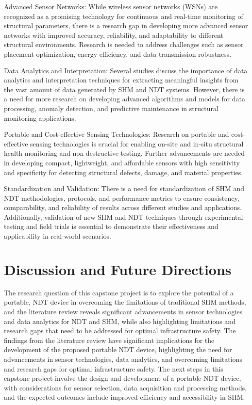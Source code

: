 \documentclass[journal, a4paper]{IEEEtran}
\begin{document}
Advanced Sensor Networks: While wireless sensor networks (WSNs) are recognized as a promising technology for continuous and real-time monitoring of structural parameters, there is a research gap in developing more advanced sensor networks with improved accuracy, reliability, and adaptability to different structural environments. Research is needed to address challenges such as sensor placement optimization, energy efficiency, and data transmission robustness. 

Data Analytics and Interpretation: Several studies discuss the importance of data analytics and interpretation techniques for extracting meaningful insights from the vast amount of data generated by SHM and NDT systems. However, there is a need for more research on developing advanced algorithms and models for data processing, anomaly detection, and predictive maintenance in structural monitoring applications. 

Portable and Cost-effective Sensing Technologies: Research on portable and cost-effective sensing technologies is crucial for enabling on-site and in-situ structural health monitoring and non-destructive testing. Further advancements are needed in developing compact, lightweight, and affordable sensors with high sensitivity and specificity for detecting structural defects, damage, and material properties. 

Standardization and Validation: There is a need for standardization of SHM and NDT methodologies, protocols, and performance metrics to ensure consistency, comparability, and reliability of results across different studies and applications. Additionally, validation of new SHM and NDT techniques through experimental testing and field trials is essential to demonstrate their effectiveness and applicability in real-world scenarios. 










\section{Discussion and Future Directions}  %
The research question of this capstone project is to explore the potential of a portable,
NDT device in overcoming the limitations of traditional SHM methods,
and the literature review reveals significant advancements in sensor technologies and data analytics for NDT and SHM,
while also highlighting limitations and research gaps that need to be addressed for optimal infrastructure safety.
The findings from the literature review have significant implications for the development of the
proposed portable NDT device, highlighting the need for advancements in sensor technologies,
data analytics, and overcoming limitations and research gaps for optimal infrastructure safety.
The next steps in this capstone project involve the design and development of a portable
NDT device, with considerations for sensor selection, data acquisition and processing methods,
and the expected outcomes include improved efficiency and accessibility in SHM.
\end{document}
